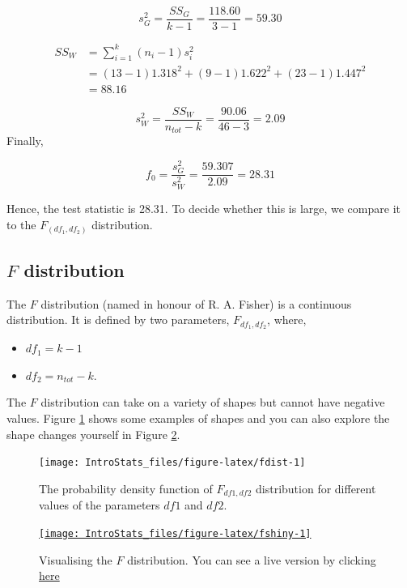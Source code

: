 \documentclass[
  oneside]{krantz}
\providecommand{\tightlist}{%
  \setlength{\itemsep}{0pt}\setlength{\parskip}{0pt}}
\begin{document}
\[s^2_G = \frac{SS_G}{k-1} = \frac{118.60}{3-1} = 59.30 \]

\begin{equation}
\begin{split}
SS_W & = \sum_{i=1}^{k}(n_i-1)s_i^2 \\
& = (13-1)1.318^2 + (9-1)1.622^2 + (23-1)1.447^2 \\
& = 88.16
\end{split}
\end{equation}

\[s^2_W = \frac{SS_W}{n_{tot}-k} = \frac{90.06}{46 - 3} = 2.09\]
Finally,

\[f_0 = \frac{s^2_G}{s^2_W} = \frac{59.307}{2.09} = 28.31\]

Hence, the test statistic is 28.31. To decide whether this is large, we compare it to the \(F_{(df_1,df_2)}\) distribution.

\hypertarget{f-distribution}{%
\subsection{\texorpdfstring{\(F\) distribution}{F distribution}}\label{f-distribution}}

The \(F\) distribution (named in honour of R. A. Fisher) is a continuous distribution. It is defined by two parameters, \(F_{df_1,df_2}\), where,

\begin{itemize}
\tightlist
\item
  \(df_1 = k - 1\)
\item
  \(df_2 = n_{tot} - k\).
\end{itemize}

The \(F\) distribution can take on a variety of shapes but cannot have negative values. Figure \ref{fig:fdist} shows some examples of shapes and you can also explore the shape changes yourself in Figure \ref{fig:fshiny}.

\begin{figure}

{\centering \texttt{[image: IntroStats\_files/figure-latex/fdist-1]} 

}

\caption{The probability density function of $F_{df1,df2}$ distribution for different values of the parameters $df1$ and $df2$.}\label{fig:fdist}
\end{figure}



\begin{figure}

{\centering \href{https://moniquemackenzie.shinyapps.io/IntroStats_Fdistribution/}{\texttt{[image: IntroStats\_files/figure-latex/fshiny-1]} }

}

\caption{Visualising the \(F\) distribution. You can see a live version by clicking \href{https://moniquemackenzie.shinyapps.io/IntroStats_Fdistribution/}{here}}\label{fig:fshiny}
\end{figure}
\end{document}
